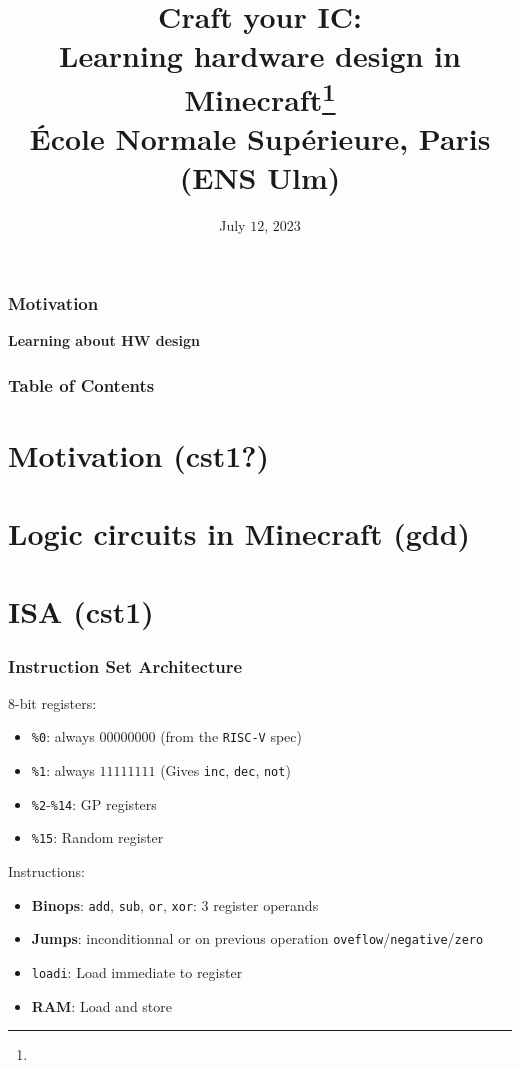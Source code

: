 \documentclass[aspectratio=169]{beamer}
\title{Craft your IC:\\Learning hardware design in
Minecraft\footnote{\tiny{}\reproduce}\\\small{} École Normale Supérieure, Paris (ENS Ulm)}
\author{\names}
\institute{FSiC $2023$}
\date{July $12$, $2023$}
\newcommand{\rv}{\texttt{RISC-V}}
\newcommand{\vrv}{\texttt{V-\rv}}
\newcommand{\hw}{HW}
\begin{document}
\beamertemplatenavigationsymbolsempty
{}

\maketitle

\begin{frame}[fragile]
	\frametitle{Motivation}

	\textbf{Learning about \hw{} design}

\end{frame}

\begin{frame}[fragile]
	\frametitle{Table of Contents}
	\tableofcontents
\end{frame}

\section{Motivation (cst1?)}

\section{Logic circuits in Minecraft (gdd)}
\begin{frame}
\end{frame}

\section{ISA (cst1)}
\begin{frame}
	\frametitle{Instruction Set Architecture}

	$8$-bit registers:

	\begin{itemize}
		\item \texttt{\%0}: always $00000000$ (from the \rv{} spec)
		\item \texttt{\%1}: always $11111111$ (Gives \texttt{inc},
		      \texttt{dec}, \texttt{not})
		\item \texttt{\%2}-\texttt{\%14}: GP registers
		\item \texttt{\%15}: Random register
	\end{itemize}

	\pause

	Instructions:
	\begin{itemize}
		\item \textbf{Binops}: \texttt{add}, \texttt{sub}, \texttt{or},
		      \texttt{xor}: $3$ register operands
		\item \textbf{Jumps}: inconditionnal or on previous operation
		      \texttt{oveflow}/\texttt{negative}/\texttt{zero}
		\item \texttt{loadi}: Load immediate to register
		\item \textbf{RAM}: Load and store
	\end{itemize}
\end{frame}
\end{document}
